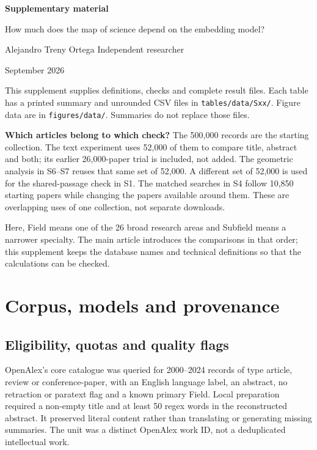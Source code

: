 \documentclass[12pt]{article}
\begin{document}
\begin{center}
{\LARGE\bfseries Supplementary material\par}
\medskip
{\large How much does the map of science depend on the embedding model?\par}
\medskip
Alejandro Treny Ortega \textbullet{} Independent researcher\par
{} September 2026
\end{center}

This supplement supplies definitions, checks and complete result files. Each table has a printed summary and unrounded CSV files in \nolinkurl{tables/data/Sxx/}. Figure data are in \nolinkurl{figures/data/}. Summaries do not replace those files.

\textbf{Which articles belong to which check?}
The 500,000 records are the starting collection. The text experiment uses 52,000 of them to compare title, abstract and both; its earlier 26,000-paper trial is included, not added. The geometric analysis in S6--S7 reuses that same set of 52,000. A different set of 52,000 is used for the shared-passage check in S1. The matched searches in S4 follow 10,850 starting papers while changing the papers available around them. These are overlapping uses of one collection, not separate downloads.

Here, Field means one of the 26 broad research areas and Subfield means a narrower specialty. The main article introduces the comparisons in that order; this supplement keeps the database names and technical definitions so that the calculations can be checked.

\medskip
{\small{}\setcounter{tocdepth}{1}\tableofcontents}
\clearpage

\section{Corpus, models and provenance}
\subsection{Eligibility, quotas and quality flags}
OpenAlex's core catalogue was queried for 2000--2024 records of type article, review or conference-paper, with an English language label, an abstract, no retraction or paratext flag and a known primary Field. Local preparation required a non-empty title and at least 50 regex words in the reconstructed abstract. It preserved literal content rather than translating or generating missing summaries. The unit was a distinct OpenAlex work ID, not a deduplicated intellectual work.
\end{document}
